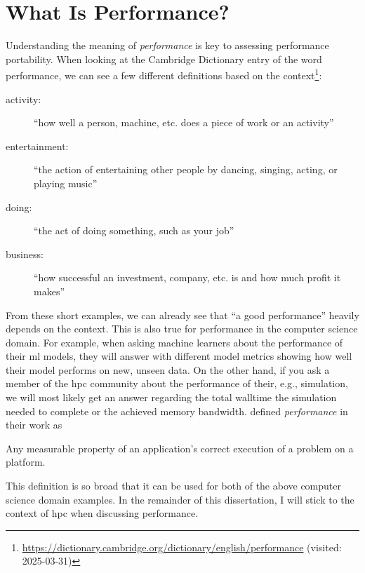 \section{What Is Performance?}
\label{sec:performance}

Understanding the meaning of \textit{performance} is key to assessing performance portability. 
When looking at the Cambridge Dictionary entry of the word performance, we can see a few different definitions based on the context\footnote{\url{https://dictionary.cambridge.org/dictionary/english/performance} (visited: 2025-03-31)}:
\begin{description}
    \item[activity:] \enquote{how well a person, machine, etc. does a piece of work or an activity}
    \item[entertainment:] \enquote{the action of entertaining other people by dancing, singing, acting, or playing music}
    \item[doing:] \enquote{the act of doing something, such as your job}
    \item[business:] \enquote{how successful an investment, company, etc. is and how much profit it makes}
\end{description}
From these short examples, we can already see that \enquote{a good performance} heavily depends on the context. 
This is also true for performance in the computer science domain. 
For example, when asking machine learners about the performance of their \gls{ml} models, they will answer with different model metrics showing how well their model performs on new, unseen data. 
On the other hand, if you ask a member of the \gls{hpc} community about the performance of their, e.g., simulation, we will most likely get an answer regarding the total walltime the simulation needed to complete or the achieved memory bandwidth. 
\citet{pennycook_implications_2019} defined \textit{performance} in their work as   
\begin{quotebox}{\citet{pennycook_implications_2019}}
    Any measurable property of an application’s correct execution of a problem on a platform.
\end{quotebox}
This definition is so broad that it can be used for both of the above computer science domain examples. 
In the remainder of this dissertation, I will stick to the context of \gls{hpc} when discussing performance. 

